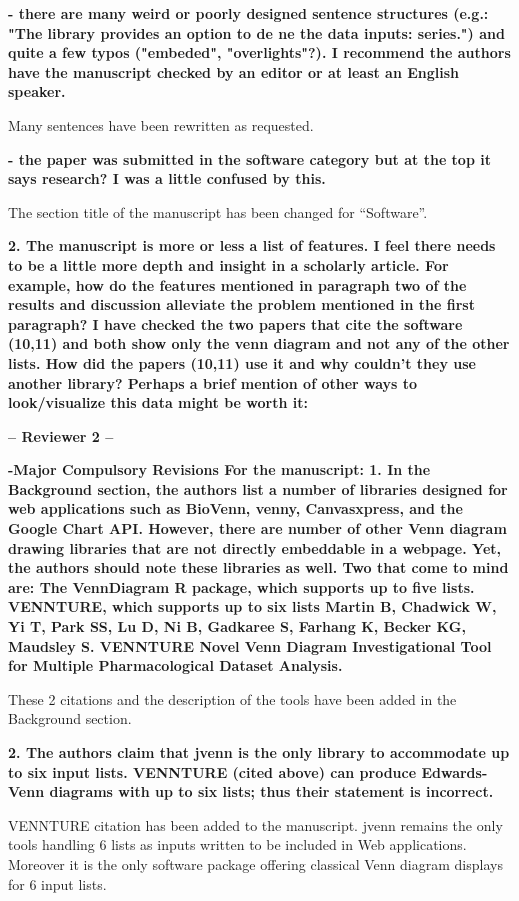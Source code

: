 \documentclass[10pt,stdletter,dateno,sigleft]{newlfm} %
\begin{document}
\begin{newlfm}
\textbf{- there are many weird or poorly designed sentence structures (e.g.:
"The library provides an option to de ne the data inputs: series.") and quite a 
few typos ("embeded", "overlights"?). I recommend the authors have the manuscript
checked by an editor or at least an English speaker.}

Many sentences have been rewritten as requested. 

\textbf{- the paper was submitted in the software category but at the top it
says research? I was a little confused by this.}

The section title of the manuscript has been changed for ``Software''.

\textbf{2. The manuscript is more or less a list of features. I feel there needs
to be a little more depth and insight in a scholarly article. For example, how
do  the features mentioned in paragraph two of the results and discussion
alleviate  the problem mentioned in the first paragraph? I have checked the two
papers  that cite the software (10,11) and both show only the venn diagram and
not  any of the other lists. How did the papers (10,11) use it and why couldn't 
they use another library? Perhaps a brief mention of other ways to
look/visualize this data might be worth it:}



\textbf{-- Reviewer 2 --}

\textbf{ -Major Compulsory Revisions
For the manuscript:
1. In the Background section, the authors list a number of libraries designed
for web applications such as BioVenn, venny, Canvasxpress, and the Google Chart 
API. However, there are number of other Venn diagram drawing libraries that are 
not directly embeddable in a webpage. Yet, the authors should note these
libraries as well. Two that come to mind are: The VennDiagram R package, which 
supports up to five lists. VENNTURE, which supports up to six lists Martin B, 
Chadwick W, Yi T, Park SS, Lu D, Ni B, Gadkaree S, Farhang K, Becker KG,
Maudsley  S. VENNTURE Novel Venn Diagram Investigational Tool for Multiple 
Pharmacological Dataset Analysis.}

These 2 citations and the description of the tools have been added in the
Background section.

\textbf{2. The authors claim that jvenn is the only library to accommodate up
to six input lists. VENNTURE (cited above) can produce Edwards-Venn
diagrams with up to six lists; thus their statement is incorrect.}

VENNTURE citation has been added to the manuscript. jvenn remains the only
tools handling 6 lists as inputs written to be included in Web applications.
Moreover it is the only software package offering classical Venn diagram displays
for 6 input lists.


\end{newlfm}
\end{document}
